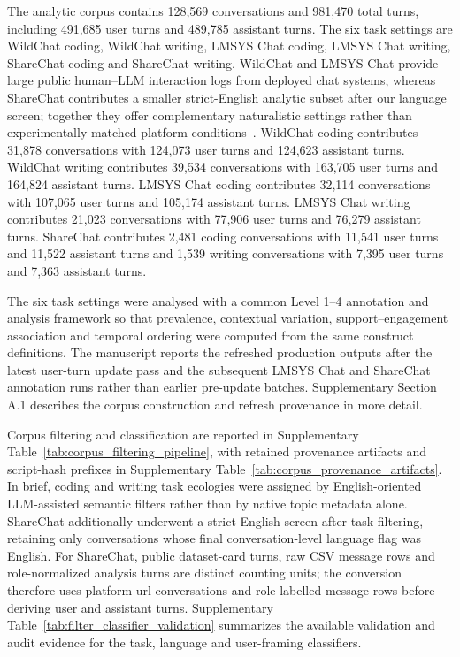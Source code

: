 The analytic corpus contains 128,569 conversations and 981,470 total turns, including 491,685 user turns and 489,785 assistant turns. The six task settings are WildChat coding, WildChat writing, LMSYS Chat coding, LMSYS Chat writing, ShareChat coding and ShareChat writing. WildChat and LMSYS Chat provide large public human--LLM interaction logs from deployed chat systems, whereas ShareChat contributes a smaller strict-English analytic subset after our language screen; together they offer complementary naturalistic settings rather than experimentally matched platform conditions~\cite{zhao2024wildchat,zheng2023lmsyschat1m,yan2025sharechat}. WildChat coding contributes 31,878 conversations with 124,073 user turns and 124,623 assistant turns. WildChat writing contributes 39,534 conversations with 163,705 user turns and 164,824 assistant turns. LMSYS Chat coding contributes 32,114 conversations with 107,065 user turns and 105,174 assistant turns. LMSYS Chat writing contributes 21,023 conversations with 77,906 user turns and 76,279 assistant turns. ShareChat contributes 2,481 coding conversations with 11,541 user turns and 11,522 assistant turns and 1,539 writing conversations with 7,395 user turns and 7,363 assistant turns.

The six task settings were analysed with a common Level 1--4 annotation and analysis framework so that prevalence, contextual variation, support--engagement association and temporal ordering were computed from the same construct definitions. The manuscript reports the refreshed production outputs after the latest user-turn update pass and the subsequent LMSYS Chat and ShareChat annotation runs rather than earlier pre-update batches. Supplementary Section A.1 describes the corpus construction and refresh provenance in more detail.

Corpus filtering and classification are reported in Supplementary Table~\ref{tab:corpus_filtering_pipeline}, with retained provenance artifacts and script-hash prefixes in Supplementary Table~\ref{tab:corpus_provenance_artifacts}. In brief, coding and writing task ecologies were assigned by English-oriented LLM-assisted semantic filters rather than by native topic metadata alone. ShareChat additionally underwent a strict-English screen after task filtering, retaining only conversations whose final conversation-level language flag was English. For ShareChat, public dataset-card turns, raw CSV message rows and role-normalized analysis turns are distinct counting units; the conversion therefore uses platform-url conversations and role-labelled message rows before deriving user and assistant turns. Supplementary Table~\ref{tab:filter_classifier_validation} summarizes the available validation and audit evidence for the task, language and user-framing classifiers.

